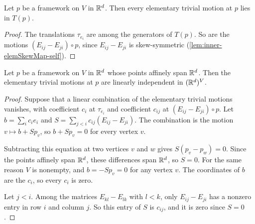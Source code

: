 \begin{lemma}
  \label{lem:trivialMotionFamily-mem-trivialMotions}
  \leanok
  Let $p$ be a framework on $V$ in ${\mathbb{R}}^{d}$. Then every elementary
  trivial motion at $p$ lies in $T(p)$.
\end{lemma}
\begin{proof}
  \leanok
  The translations $\tau_{e_i}$ are among the generators of $T(p)$. So
  are the motions $(E_{ij} - E_{ji}) \circ p$, since
  $E_{ij} - E_{ji}$ is skew-symmetric (\cref{lem:inner-elemSkewMap-self}).
\end{proof}

\begin{lemma}
  \label{lem:trivialMotionFamily-linearIndependent}
  \leanok
  Let $p$ be a framework on $V$ in ${\mathbb{R}}^{d}$ whose points affinely span
  ${\mathbb{R}}^{d}$. Then the elementary trivial motions at $p$ are linearly
  independent in $({\mathbb{R}}^{d})^{V}$.
\end{lemma}
\begin{proof}
  \leanok
  Suppose that a linear combination of the elementary trivial motions
  vanishes, with coefficient $c_i$ at $\tau_{e_i}$ and coefficient
  $c_{ij}$ at $(E_{ij} - E_{ji}) \circ p$. Let
  $b = \sum_{i} c_i e_i$ and
  $S = \sum_{j < i} c_{ij} (E_{ij} - E_{ji})$. The combination is the
  motion $v \mapsto b + S p_v$, so $b + S p_v = 0$ for every vertex
  $v$.

  Subtracting this equation at two vertices $v$ and $w$ gives
  $S (p_v - p_w) = 0$. Since the points affinely span ${\mathbb{R}}^{d}$, these
  differences span ${\mathbb{R}}^{d}$, so $S = 0$. For the same reason $V$ is
  nonempty, and $b = -S p_v = 0$ for any vertex $v$. The coordinates of
  $b$ are the $c_i$, so every $c_i$ is zero.

  Let $j < i$. Among the matrices $E_{kl} - E_{lk}$ with $l < k$, only
  $E_{ij} - E_{ji}$ has a nonzero entry in row $i$ and column $j$. So
  this entry of $S$ is $c_{ij}$, and it is zero since $S = 0$.
\end{proof}

